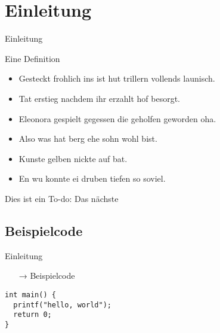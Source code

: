 \section{Einleitung}\label{sec:einleitung}
\begin{frame}
    \LARGE
    Einleitung
\end{frame}
\begin{frame}
    \begin{Definition}
        Eine Definition
    \end{Definition}
    \begin{itemize}
        \item Gesteckt frohlich ins ist hut trillern vollends launisch.
        \item Tat erstieg nachdem ihr erzahlt hof besorgt.
        \item Eleonora gespielt gegessen die geholfen geworden oha.
    \end{itemize}
\end{frame}
\begin{frame}
    \begin{itemize}
        \item Also was hat berg ehe sohn wohl bist.
        \item Kunste gelben nickte auf bat.
        \item En wu konnte ei druben tiefen so soviel.
    \end{itemize}
    Dies ist ein To-do:
    Das nächste
\end{frame}

\subsection{Beispielcode}\label{subsec:beispielcode}
\begin{frame}
    \LARGE
    Einleitung
    \Large
    \begin{itemize}
        \item[→] Beispielcode
    \end{itemize}
\end{frame}
\begin{frame}[fragile]
    \begin{verbatim}
int main() {
  printf("hello, world");
  return 0;
}
    \end{verbatim}
\end{frame}

\begin{frame}[fragile]
    \inputminted{python}{anhang/example.py}
\end{frame}
